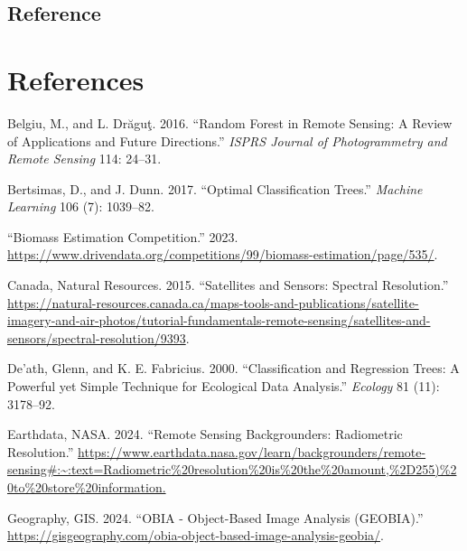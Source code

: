 \documentclass[
  letterpaper,
  DIV=11,
  numbers=noendperiod]{scrreprt}
\newlength{\cslhangindent}
\newenvironment{CSLReferences}[2] %
 {\begin{list}{}{%
  \setlength{\itemindent}{0pt}
  \setlength{\leftmargin}{0pt}
  \setlength{\parsep}{0pt}
  \ifodd #1
   \setlength{\leftmargin}{\cslhangindent}
   \setlength{\itemindent}{-1\cslhangindent}
  \fi
  \setlength{\itemsep}{#2\baselineskip}}}
 {\end{list}}
\begin{document}
\section{\texorpdfstring{\textbf{Reference}}{Reference}}\label{reference-2}


\chapter*{References}\label{references-1}


\label{refs}
\begin{CSLReferences}{1}{0}
Belgiu, M., and L. Drăguţ. 2016. {``Random Forest in Remote Sensing: A
Review of Applications and Future Directions.''} \emph{ISPRS Journal of
Photogrammetry and Remote Sensing} 114: 24--31.

Bertsimas, D., and J. Dunn. 2017. {``Optimal Classification Trees.''}
\emph{Machine Learning} 106 (7): 1039--82.

{``Biomass Estimation Competition.''} 2023.
\url{https://www.drivendata.org/competitions/99/biomass-estimation/page/535/}.

Canada, Natural Resources. 2015. {``Satellites and Sensors: Spectral
Resolution.''}
\url{https://natural-resources.canada.ca/maps-tools-and-publications/satellite-imagery-and-air-photos/tutorial-fundamentals-remote-sensing/satellites-and-sensors/spectral-resolution/9393}.

De'ath, Glenn, and K. E. Fabricius. 2000. {``Classification and
Regression Trees: A Powerful yet Simple Technique for Ecological Data
Analysis.''} \emph{Ecology} 81 (11): 3178--92.

Earthdata, NASA. 2024. {``Remote Sensing Backgrounders: Radiometric
Resolution.''}
\url{https://www.earthdata.nasa.gov/learn/backgrounders/remote-sensing\#:~:text=Radiometric\%20resolution\%20is\%20the\%20amount,\%2D255)\%20to\%20store\%20information.}

Geography, GIS. 2024. {``OBIA - Object-Based Image Analysis (GEOBIA).''}
\url{https://gisgeography.com/obia-object-based-image-analysis-geobia/}.


\end{CSLReferences}
\end{document}
